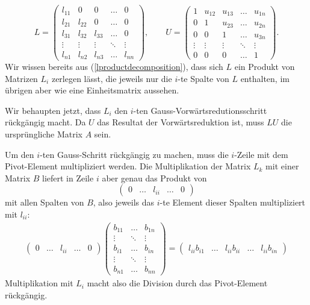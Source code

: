 \[
L=\begin{pmatrix}
l_{11}&0     &0     &\dots &0\\
l_{21}&l_{22}&0     &\dots &0\\
l_{31}&l_{32}&l_{33}&\dots &0\\
\vdots&\vdots&\vdots&\ddots&\vdots\\
l_{n1}&l_{n2}&l_{n3}&\dots &l_{nn}
\end{pmatrix},
\qquad
U=
\begin{pmatrix}
1     &u_{12}&u_{13}&\dots &u_{1n}\\
0     &1     &u_{23}&\dots &u_{2n}\\
0     &0     &1     &\dots &u_{3n}\\
\vdots&\vdots&\vdots&\ddots&\vdots\\
0     &0     &0     &\dots &1
\end{pmatrix}.
\]
Wir wissen bereits aus (\ref{lproductdecomposition}), dass sich $L$
ein Produkt von Matrizen $L_i$ zerlegen lässt, die jeweils nur
die $i$-te Spalte von $L$ enthalten, im übrigen aber wie eine Einheitsmatrix
aussehen.

Wir behaupten jetzt, dass $L_i$ den $i$-ten Gauss-Vorwärtsredutionsschritt
rück\-gängig macht.
Da $U$ das Resultat der Vorwärtsreduktion ist, 
muss $LU$ die ursprüngliche Matrix $A$ sein.

Um den $i$-ten Gauss-Schritt rückgängig zu machen, muss die
$i$-Zeile mit dem Pivot-Element multipliziert werden.
Die Multiplikation
der Matrix $L_k$ mit einer Matrix $B$ liefert in Zeile $i$ aber genau das Produkt
von
\[
\begin{pmatrix}
0&\dots&l_{ii}&\dots &0
\end{pmatrix}
\]
mit allen Spalten von $B$, also jeweils das $i$-te Element dieser
Spalten multipliziert mit $l_{ii}$:
\begin{align*}
\begin{pmatrix}
0&\dots&l_{ii}&\dots &0
\end{pmatrix}
\begin{pmatrix}
b_{11}&\dots &b_{1n}\\
\vdots&\ddots&\vdots\\
b_{i1}&\dots &b_{in}\\
\vdots&\ddots&\vdots\\
b_{n1}&\dots &b_{nn}
\end{pmatrix}
=
\begin{pmatrix}
l_{ii}b_{i1}&\dots &l_{ii}b_{ii}&\dots &l_{ii}b_{in}
\end{pmatrix}
\end{align*}
Multiplikation mit $L_i$ macht
also die Division durch das Pivot-Element rückgängig.

